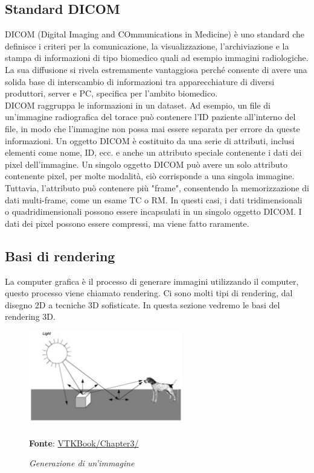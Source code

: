 \subsection{Standard DICOM}
DICOM (Digital Imaging and COmmunications in Medicine) è uno standard che definisce i criteri per la comunicazione, la visualizzazione, l'archiviazione e la stampa di informazioni di tipo biomedico quali ad esempio immagini radiologiche. La sua diffusione si rivela estremamente vantaggiosa perché consente di avere una solida base di interscambio di informazioni tra apparecchiature di diversi produttori, server e PC, specifica per l'ambito biomedico.
\\
DICOM raggruppa le informazioni in un dataset. Ad esempio, un file di un'immagine radiografica del torace può contenere l'ID paziente all'interno del file, in modo che l'immagine non possa mai essere separata per errore da queste informazioni. Un oggetto DICOM è costituito da una serie di attributi, inclusi elementi come nome, ID, ecc. e anche un attributo speciale contenente i dati dei pixel dell'immagine. Un singolo oggetto DICOM può avere un solo attributo contenente pixel, per molte modalità, ciò corrisponde a una singola immagine. Tuttavia, l'attributo può contenere più "frame", consentendo la memorizzazione di dati multi-frame, come un esame TC o RM. In questi casi, i dati tridimensionali o quadridimensionali possono essere incapsulati in un singolo oggetto DICOM. I dati dei pixel possono essere compressi, ma viene fatto raramente.

\subsection{Basi di rendering}\label{sec:basi-rendering}
La computer grafica è il processo di generare immagini utilizzando il computer, questo processo viene chiamato rendering. Ci sono molti tipi di rendering, dal disegno 2D a tecniche 3D sofisticate. In questa sezione vedremo le basi del rendering 3D.

\begin{figure}[h]
    \centering
    \includegraphics[width=0.6\textwidth]{immagini/volumerendering/lightpropagation.png}
    \caption{\textit{Generazione di un'immagine}}
    \textbf{Fonte}: \href{https://lorensen.github.io/VTKExamples/site/VTKBook/03Chapter3/}{VTKBook/Chapter3/}
    \label{fig: Propagazione della luce}
\end{figure}

